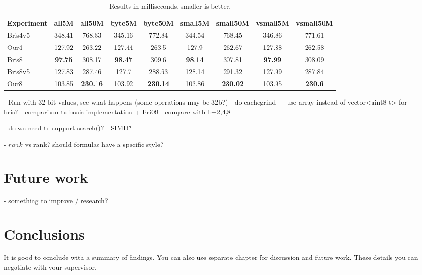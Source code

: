 \begin{table}
\centering
\caption{Results in milliseconds, smaller is better.\label{table:results1}}
\begin{tabular}{l||c c c c c c c c} 
Experiment & all5M & all50M & byte5M & byte50M & small5M & small50M & vsmall5M & vsmall50M\\ 
\hline \hline 
Bris4v5 & 348.41 & 768.83 & 345.16 & 772.84 & 344.54 & 768.45 & 346.86 & 771.61 \\
Our4    & 127.92 & 263.22 & 127.44 & 263.5  & 127.9  & 262.67 & 127.88 & 262.58 \\
Bris8   & \textbf{97.75}  & 308.17 & \textbf{98.47}  & 309.6  & \textbf{98.14}  & 307.81 & \textbf{97.99}  & 308.09 \\
Bris8v5 & 127.83 & 287.46 & 127.7  & 288.63 & 128.14 & 291.32 & 127.99 & 287.84 \\
Our8    & 103.85 & \textbf{230.16} & 103.92 & \textbf{230.14} & 103.86 & \textbf{230.02} & 103.95 & \textbf{230.6} \\

\hline
%
\end{tabular}
\end{table}



 - Run with 32 bit values, see what happens (some operations may be 32b?)
 - do cachegrind
 - 
 - use array instead of vector<uint8 t> for bris?
- comparison to basic implementation + Bri09
  - compare with b=2,4,8

 - do we need to support search()?
 - SIMD?

 - $rank$ vs rank? should formulas have a specific style?

\chapter{Future work}
 - something to improve / research?

\chapter{Conclusions\label{chapter:conclusions}}

It is good to conclude with a summary of findings. You can also use separate chapter for discussion and future work. These details you can negotiate with your supervisor.
